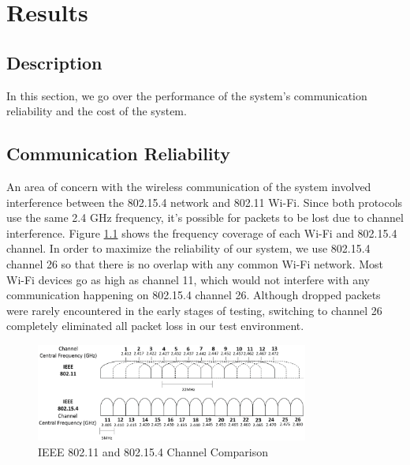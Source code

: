 \chapter{Results}

\section{Description}
In this section, we go over the performance of the system's communication reliability and the cost of the system.

\section{Communication Reliability}
An area of concern with the wireless communication of the system involved interference between the 802.15.4 network and 802.11 Wi-Fi. Since both protocols use the same 2.4 GHz frequency, it's possible for packets to be lost due to channel interference. Figure \ref{fig:802154} shows the frequency coverage of each Wi-Fi and 802.15.4 channel. In order to maximize the reliability of our system, we use 802.15.4 channel 26 so that there is no overlap with any common Wi-Fi network. Most Wi-Fi devices go as high as channel 11, which would not interfere with any communication happening on 802.15.4 channel 26. Although dropped packets were rarely encountered in the early stages of testing, switching to channel 26 completely eliminated all packet loss in our test environment.

\begin{figure}[h]
  \includegraphics[width=0.8\textwidth]{802154.png}
  \centering
  \caption{IEEE 802.11 and 802.15.4 Channel Comparison \cite{pdf:802.15.4}}
  \label{fig:802154}
\end{figure}

